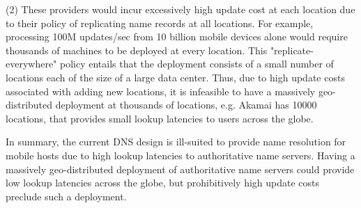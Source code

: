 {%


(2) These providers would incur excessively high update cost at each location due to their policy of replicating name records at all locations. For example, processing 100M updates/sec from 10 billion mobile devices alone would require thousands of machines to be deployed at every location. This "replicate-everywhere" policy entails that the deployment consists of a small number of locations each of the size of a large data center. Thus, due to high update costs associated with adding new locations, it is infeasible to have a massively geo-distributed deployment at thousands of locations, e.g. Akamai has 10000 locations, that provides small lookup latencies to users across the globe. 

In summary, the current DNS design is ill-suited to provide name resolution for mobile hosts due to high lookup latencies to authoritative name servers. Having a massively geo-distributed deployment of authoritative name servers could provide low lookup latencies across the globe, but prohibitively high update costs preclude such a deployment. 
}







